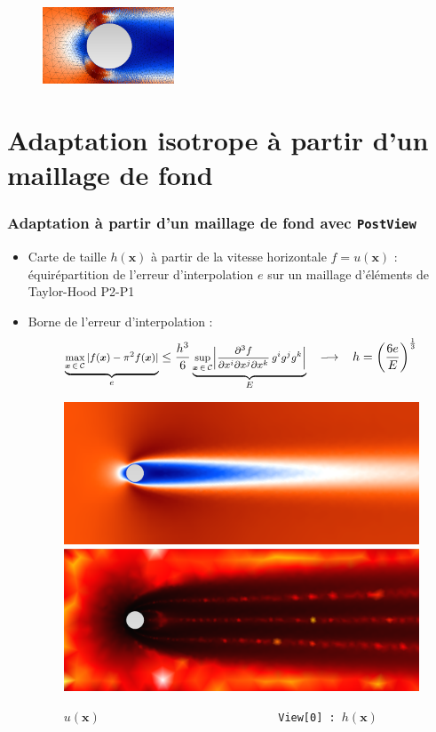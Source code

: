 \documentclass[aspectratio=169]{beamer}
\newcommand{\bfx}[0]{\boldsymbol{x}}
\begin{document}
\begin{frame}[fragile]
\begin{figure}
  \hspace{0.6cm}
  \includegraphics[width=0.35\textwidth]{figures/zoom.png}
  \caption{}
  \label{}
\end{figure}
\end{frame}

\section{Adaptation isotrope à partir d'un maillage de fond}
\begin{frame}[fragile]
\frametitle{Adaptation à partir d'un maillage de fond avec \texttt{PostView}}
\begin{itemize}
  \item Carte de taille $h(\bfx)$ à partir de la vitesse horizontale $f = u(\bfx)$ : équirépartition de l'erreur d'interpolation $e$ sur un maillage d'éléments de Taylor-Hood P2-P1
  \item Borne de l'erreur d'interpolation :
  \begin{equation*}
    \footnotesize
    \underbrace{\max_{\bfx \,\in \,\mathcal{C}} \vert f(\bfx) - \pi^2f(\bfx) \vert}_{e} \leq \frac{h^3}{6} \underbrace{\sup_{\bfx \,\in \,\mathcal{C}} \biggr\vert \frac{\partial^3 f}{\partial x^i \partial x^j \partial x^k} \,g^ig^jg^k \biggr\vert}_{E} ~~~ \longrightarrow  ~~~ h = \left(\frac{6e}{E}\right)^{\frac{1}{3}}
  \end{equation*}
  \begin{figure}
    \hspace{-0.8cm}
    \includegraphics[width=0.45\linewidth]{figures/solU_flow.png}
    \hspace{0.5cm}
    \includegraphics[width=0.45\linewidth]{figures/sizefield.png}
    \hspace{0.5cm}
    \caption{\texttt{$u(\bfx)$ ~~~~~~~~~~~~~~~~~~~~~~~~~~ View[0] : $h(\bfx)$}}
    \label{}
  \end{figure}
\end{itemize}
\end{frame}
\end{document}
